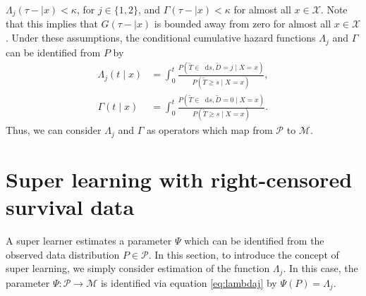 \documentclass{statsoc}
\newcommand*\diff{\mathop{}\!\mathrm{d}}
\newcommand{\1}{\mathds{1}}
\begin{document}
\(\Lambda_{j}(\tau- \mid x)<\kappa \), for \(j\in\{1,2\}\), and
\(\Gamma(\tau- \mid x)<\kappa\) for almost all \(x\in\mathcal X\). Note that this
implies that \(G(\tau- \mid x)\) is bounded away from zero for almost all \(x\in\mathcal X\).
Under these assumptions, the conditional cumulative hazard functions
\(\Lambda_{j}\) and \(\Gamma\) can be identified from \(P\) by
\begin{align}
  \Lambda_{j}(t \mid x) &= \int_0^t\frac{  P(\tilde T \in \diff s, \tilde D=j \mid X=x )}{P(\tilde T \geq s \mid X=x )}, \label{eq:lambdaj}\\
  \Gamma(t \mid x) &= \int_0^t\frac{  P(\tilde T \in \diff s, \tilde D=0 \mid X=x )}{P(\tilde T \geq s \mid X=x )}\label{eq:gamma}.
\end{align}
Thus, we can consider $\Lambda_j$ and \(\Gamma\) as operators which map from
\( \mathcal{P} \) to \(\mathcal M\).

 
\section{Super learning with right-censored survival data}
\label{sec:super-learning}

A super learner estimates a parameter $\Psi$ which can be identified from the
observed data distribution \(P\in\mathcal P\). In this section, to introduce the
concept of super learning, we simply consider estimation of the function
\( \Lambda_{j}\). In this case, the parameter \(\Psi:\mathcal P\to\mathcal M\)
is identified via equation \eqref{eq:lambdaj} by \(\Psi(P)=\Lambda_j\).
\end{document}

